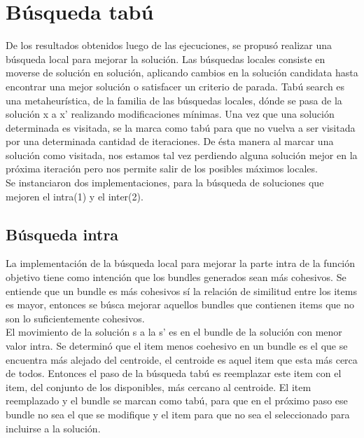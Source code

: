 \section{Búsqueda tabú}
De los resultados obtenidos luego de las ejecuciones, se propusó realizar una búsqueda local para mejorar la solución. 
Las búsquedas locales consiste en moverse de solución en solución, aplicando cambios en la solución candidata hasta encontrar una
mejor solución o satisfacer un criterio de parada.
Tabú search es una metaheurística, de la familia de las búsquedas locales, dónde se pasa de la solución x a x' 
realizando modificaciones mínimas. Una vez que una solución determinada es visitada, se la marca como tabú para que no vuelva a ser visitada por una determinada cantidad de iteraciones. De ésta manera al marcar una solución como visitada, nos estamos tal vez perdiendo alguna solución mejor en la próxima iteración pero nos permite salir de los posibles máximos locales.\\
Se instanciaron dos implementaciones, para la búsqueda de soluciones que mejoren el intra(1) y el inter(2).\\
\subsection{Búsqueda intra}
La implementación de la búsqueda local para mejorar la parte intra de la función objetivo tiene como intención que los bundles 
generados sean más cohesivos. Se entiende que un bundle es más cohesivos sí la relación de similitud entre los items es mayor, 
entonces se búsca mejorar aquellos bundles que contienen items que no son lo suficientemente cohesivos.\\
El movimiento de la solución s a la s' es en el bundle de la solución con menor valor intra. Se determinó que el item menos coehesivo
en un bundle es el que se encuentra más alejado del centroide, el centroide es aquel item que esta más cerca de todos. Entonces el paso 
de la búsqueda tabú es reemplazar este item con el item, del conjunto de los disponibles, más cercano al centroide. El item reemplazado y el bundle se marcan como tabú, para que en el próximo paso ese bundle no sea el que se modifique y el item para que no sea el seleccionado para incluirse a la solución.

